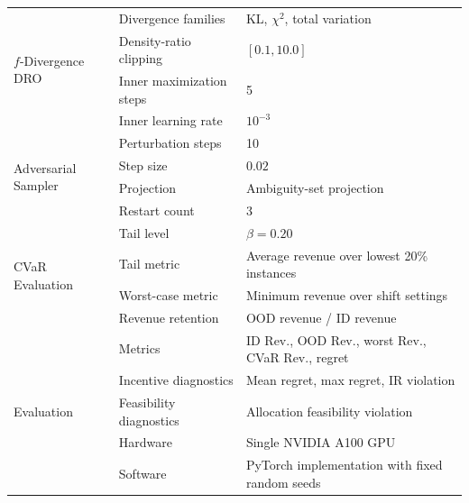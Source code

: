 \begin{table}[t]
{\begin{tabular}{lll}
\midrule
\multirow{4}{*}{$f$-Divergence DRO}
& Divergence families & KL, $\chi^2$, total variation \\
& Density-ratio clipping & $[0.1,10.0]$ \\
& Inner maximization steps & 5 \\
& Inner learning rate & $10^{-3}$ \\
\midrule
\multirow{4}{*}{Adversarial Sampler}
& Perturbation steps & 10 \\
& Step size & $0.02$ \\
& Projection & Ambiguity-set projection \\
& Restart count & 3 \\
\midrule
\multirow{4}{*}{CVaR Evaluation}
& Tail level & $\beta=0.20$ \\
& Tail metric & Average revenue over lowest 20\% instances \\
& Worst-case metric & Minimum revenue over shift settings \\
& Revenue retention & OOD revenue / ID revenue \\
\midrule
\multirow{5}{*}{Evaluation}
& Metrics & ID Rev., OOD Rev., worst Rev., CVaR Rev., regret \\
& Incentive diagnostics & Mean regret, max regret, IR violation \\
& Feasibility diagnostics & Allocation feasibility violation \\
& Hardware & Single NVIDIA A100 GPU \\
& Software & PyTorch implementation with fixed random seeds \\
\bottomrule
\end{tabular}
}
\end{table}

